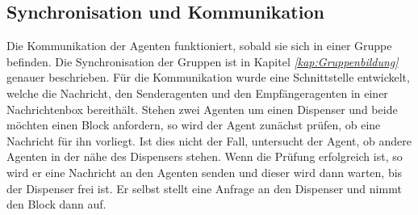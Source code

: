 \subsection{Synchronisation und Kommunikation}
Die Kommunikation der Agenten funktioniert, sobald sie sich in einer Gruppe befinden. Die Synchronisation der Gruppen ist in Kapitel \textit{\ref{kap:Gruppenbildung}} genauer beschrieben. Für die Kommunikation wurde eine Schnittstelle entwickelt, welche die Nachricht, den Senderagenten und den Empfängeragenten in einer Nachrichtenbox bereithält. Stehen zwei Agenten um einen Dispenser und beide möchten einen Block anfordern, so wird der Agent zunächst prüfen, ob eine Nachricht für ihn vorliegt. Ist dies nicht der Fall, untersucht der Agent, ob andere Agenten in der nähe des Dispensers stehen. Wenn die Prüfung erfolgreich ist, so wird er eine Nachricht an den Agenten senden und dieser wird dann warten, bis der Dispenser frei ist. Er selbst stellt eine Anfrage an den Dispenser und nimmt den Block dann auf.
